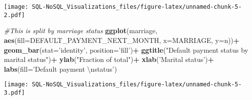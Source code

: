 \documentclass[]{article}
\newenvironment{Shaded}{\begin{snugshade}}{\end{snugshade}}
\newcommand{\KeywordTok}[1]{\textcolor[rgb]{0.13,0.29,0.53}{\textbf{#1}}}
\newcommand{\DataTypeTok}[1]{\textcolor[rgb]{0.13,0.29,0.53}{#1}}
\newcommand{\CharTok}[1]{\textcolor[rgb]{0.31,0.60,0.02}{#1}}
\newcommand{\StringTok}[1]{\textcolor[rgb]{0.31,0.60,0.02}{#1}}
\newcommand{\CommentTok}[1]{\textcolor[rgb]{0.56,0.35,0.01}{\textit{#1}}}
\newcommand{\OperatorTok}[1]{\textcolor[rgb]{0.81,0.36,0.00}{\textbf{#1}}}
\newcommand{\NormalTok}[1]{#1}
\begin{document}
\texttt{[image: SQL-NoSQL\_Visualizations\_files/figure-latex/unnamed-chunk-5-2.pdf]}

\begin{Shaded}
\begin{Highlighting}[]
\CommentTok{#This is split by marriage status}
\KeywordTok{ggplot}\NormalTok{(marriage, }\KeywordTok{aes}\NormalTok{(}\DataTypeTok{fill=}\NormalTok{DEFAULT_PAYMENT_NEXT_MONTH, }\DataTypeTok{x=}\NormalTok{MARRIAGE, }\DataTypeTok{y=}\NormalTok{n))}\OperatorTok{+}
\StringTok{  }\KeywordTok{geom_bar}\NormalTok{(}\DataTypeTok{stat=}\StringTok{'identity'}\NormalTok{, }\DataTypeTok{position=}\StringTok{'fill'}\NormalTok{)}\OperatorTok{+}
\StringTok{  }\KeywordTok{ggtitle}\NormalTok{(}\StringTok{"Default payment status by marital status"}\NormalTok{)}\OperatorTok{+}
\StringTok{  }\KeywordTok{ylab}\NormalTok{(}\StringTok{"Fraction of total"}\NormalTok{)}\OperatorTok{+}
\StringTok{  }\KeywordTok{xlab}\NormalTok{(}\StringTok{'Marital status'}\NormalTok{)}\OperatorTok{+}
\StringTok{  }\KeywordTok{labs}\NormalTok{(}\DataTypeTok{fill=}\StringTok{'Default payment }\CharTok{\textbackslash{}n}\StringTok{status'}\NormalTok{)}
\end{Highlighting}
\end{Shaded}

\texttt{[image: SQL-NoSQL\_Visualizations\_files/figure-latex/unnamed-chunk-5-3.pdf]}

\begin{Shaded}
\end{Shaded}
\end{document}
